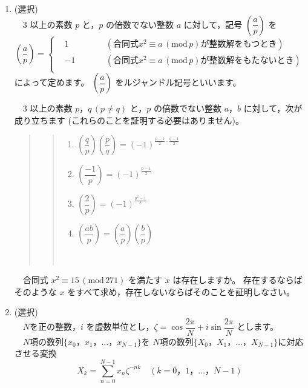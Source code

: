 \documentclass[dvipdfmx, 11pt]{jsarticle}
\renewcommand{\(}[0]{\left(}
\renewcommand{\)}[0]{\right)}
\renewcommand{\[}[0]{\left[}
\renewcommand{\]}[0]{\right]}
\renewcommand{\labelenumii}{(\arabic{enumii})}
\begin{document}
\begin{enumerate}


	\item \quad (選択)\\
	　$3$ 以上の素数 $p$ と，$p$ の倍数でない整数 $a$ に対して，記号 $\( \dfrac{a}{p} \)$ を
	\begin{equation*}
		\( \frac{a}{p} \) = \left\{
			\begin{alignedat}{2}
				&1		&\qquad		& (\mbox{合同式} x^2 \equiv a \, ( \mathrm{mod} \, p) が整数解をもつとき)\\
				&-1	&\qquad		& (\mbox{合同式} x^2 \equiv a \, (\mathrm{mod} \, p) が整数解をもたないとき)\\
			\end{alignedat}
		\right.
	\end{equation*}
	によって定めます。
	$\( \dfrac{a}{p} \)$ をルジャンドル記号といいます。
	
	　$3$ 以上の素数 $p$，$q \, (p \neq q)$ と，$p$ の倍数でない整数 $a$，$b$ に対して，次が成り立ちます (これらのことを証明する必要はありません)。\\
		
	\begin{quote}
		\begin{quotation}
			\begin{enumerate}
				\renewcommand{\labelenumii}{\textbf{性質\arabic{enumii}.}}
				\setlength{\itemsep}{4pt}
				\item $\( \dfrac{q}{p} \) \( \dfrac{p}{q} \) = (-1)^{\frac{p - 1}{2} \cdot \frac{q - 1}{2}}$
				\item $\( \dfrac{-1}{p} \)  = (-1)^{\frac{p - 1}{2}}$
				\item $\( \dfrac{2}{p} \) = (-1)^{\frac{p^2 - 1}{8}}$
				\item $\( \dfrac{ab}{p} \) = \( \dfrac{a}{p} \) \( \dfrac{b}{p} \)$
			\end{enumerate} \ 
		\end{quotation}
	\end{quote}

	　合同式 $x^2 \equiv 15 \, (\mathrm{mod} \, 271)$ を満たす $x$ は存在しますか。
	存在するならばそのような $x$ をすべて求め，存在しないならばそのことを証明しなさい。
	
	\newpage
		
	\item \quad (選択)\\
	　$N$を正の整数，$i$ を虚数単位とし，$\zeta = \cos \dfrac{2\pi}{N} + i \sin \dfrac{2\pi}{N}$ とします。\\
	　$N$項の数列$\{ x_0，x_1，…，x_{N - 1} \}$を $N$項の数列$\{ X_0，X_1，…，X_{N - 1} \}$に対応させる変換
	\begin{equation*}
		X_k = \sum_{n = 0}^{N - 1} x_n \zeta^{-nk} \quad (k = 0， 1，…， N - 1)
	\end{equation*}
	

\end{enumerate}
\end{document}
